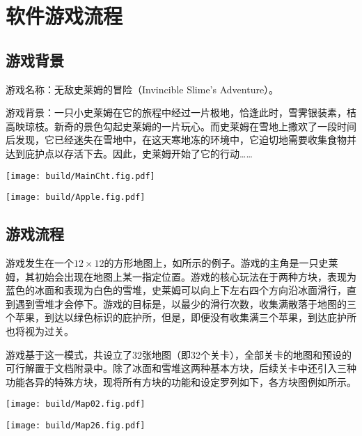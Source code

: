 \section{软件游戏流程}

\subsection{游戏背景}
游戏名称：无敌史莱姆的冒险（Invincible Slime's Adventure）。

游戏背景：一只小史莱姆在它的旅程中经过一片极地，恰逢此时，雪霁银装素，桔高映琼枝。新奇的景色勾起史莱姆的一片玩心。而史莱姆在雪地上撒欢了一段时间后发现，它已经迷失在雪地中，在这天寒地冻的环境中，它迫切地需要收集食物并达到庇护点以存活下去。因此，史莱姆开始了它的行动……

\begin{Figure}[游戏角色设计]
    \begin{FigureSub}[史莱姆]
        \texttt{[image: build/MainCht.fig.pdf]}
    \end{FigureSub}
    \hspace{2cm}
    \begin{FigureSub}[苹果]
        \texttt{[image: build/Apple.fig.pdf]}
    \end{FigureSub}
\end{Figure}

\subsection{游戏流程}

游戏发生在一个$12\times 12$的方形地图上，如所示的例子。游戏的主角是一只史莱姆，其初始会出现在地图上某一指定位置。游戏的核心玩法在于两种方块，表现为蓝色的冰面和表现为白色的雪堆，史莱姆可以向上下左右四个方向沿冰面滑行，直到遇到雪堆才会停下。游戏的目标是，以最少的滑行次数，收集满散落于地图的三个苹果，到达以绿色标识的庇护所，但是，即便没有收集满三个苹果，到达庇护所也将视为过关。

游戏基于这一模式，共设立了32张地图（即32个关卡），全部关卡的地图和预设的可行解置于文档附录中。除了冰面和雪堆这两种基本方块，后续关卡中还引入三种功能各异的特殊方块，现将所有方块的功能和设定罗列如下，各方块图例如所示。
\begin{Figure}[游戏地图示例]
    \begin{FigureSub}[关卡02的地图]
        \texttt{[image: build/Map02.fig.pdf]}
    \end{FigureSub}
    \hspace{1cm}
    \begin{FigureSub}[关卡24的地图]
        \texttt{[image: build/Map26.fig.pdf]}
    \end{FigureSub}
\end{Figure}

